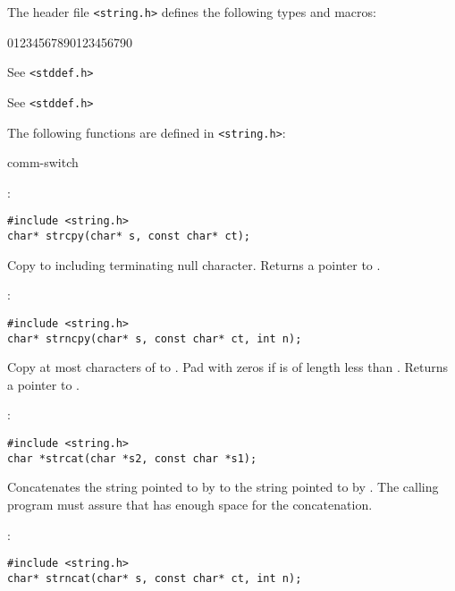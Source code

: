 The header file \verb+<string.h>+ defines the following types and macros:
\begin{Ventry2}{01234567890123456790}
\item[size\_t] See \verb+<stddef.h>+ 
\item[NULL] See \verb+<stddef.h>+ 
\end{Ventry2}

The following functions are defined in \verb+<string.h>+:


\begin{Ventry2}{comm-switch  }

\item[strcpy]
\label{item:strcpy}
:
\begin{production}
\begin{verbatim}
#include <string.h>
char* strcpy(char* s, const char* ct);
\end{verbatim}
\end{production}

     Copy  to  including terminating null character. Returns 
	a pointer to .

\item[strncpy]
\label{item:strncpy}
:
\begin{production}
\begin{verbatim}
#include <string.h>
char* strncpy(char* s, const char* ct, int n);
\end{verbatim}
\end{production}

     Copy at most  characters of  to . Pad with zeros
     if  is of length less than . Returns a pointer to .

\item[strcat]
\label{item:strcat}
:
\begin{production}
\begin{verbatim}
#include <string.h>
char *strcat(char *s2, const char *s1);
\end{verbatim}
\end{production}

Concatenates the string pointed to by  to the string pointed to by
.  The calling program must assure that  has enough space for the
concatenation.

\item[strncat]
\label{item:strncat}
:
\begin{production}
\begin{verbatim}
#include <string.h>
char* strncat(char* s, const char* ct, int n);
\end{verbatim}
\end{production}


\end{Ventry2}
